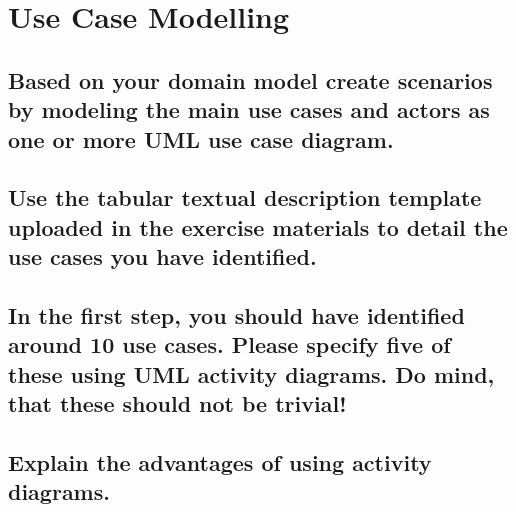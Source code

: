 \section{Use Case Modelling}
	
		\subsection{ Based on your domain model create scenarios by modeling the main use cases
			and actors as one or more UML use case diagram.}
	
		\subsection{Use the tabular textual description template uploaded in the exercise materials
			to detail the use cases you have identified.}
		
		\subsection{In the first step, you should have identified around 10 use cases. Please specify
			five of these using UML activity diagrams. Do mind, that these should not be
			trivial!}
		
		\subsection{Explain the advantages of using activity diagrams.}
